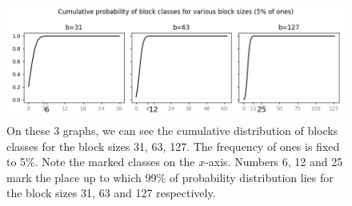 \begin{figure}
	\centerline{
		\includegraphics[width=\textwidth]{images/hybrid_encoding_motivation}
	}
	\caption[TODO]{On these 3 graphs, we can see the cumulative distribution
    of blocks classes for the block sizes 31, 63, 127. The frequency of ones is
    fixed to 5\%. Note the marked classes on the $x$-axis. Numbers 6, 12 and
    25 mark the place up to which 99\% of probability distribution lies for
    the block sizes 31, 63 and 127 respectively.
	}
	\label{obr:hybridEncodingDistribution}
\end{figure}

